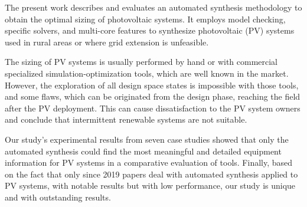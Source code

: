 \documentclass[11pt]{article}
\begin{document}
The present work describes and evaluates an automated synthesis methodology to obtain the optimal sizing of photovoltaic systems. It employs model checking, specific solvers, and multi-core features to synthesize photovoltaic (PV) systems used in rural areas or where grid extension is unfeasible.

The sizing of PV systems is usually performed by hand or with commercial specialized simulation-optimization tools, which are well known in the market. However, the exploration of all design space states is impossible with those tools, and some flaws, which can be originated from the design phase, reaching the field after the PV deployment. This can cause dissatisfaction to the PV system owners and conclude that intermittent renewable systems are not suitable.
   
Our study's experimental results from seven case studies showed that only the automated synthesis could find the most meaningful and detailed equipment information for PV systems in a comparative evaluation of tools. Finally, based on the fact that only since 2019 papers deal with automated synthesis applied to PV systems, with notable results but with low performance, our study is unique and with outstanding results.
\end{document}
